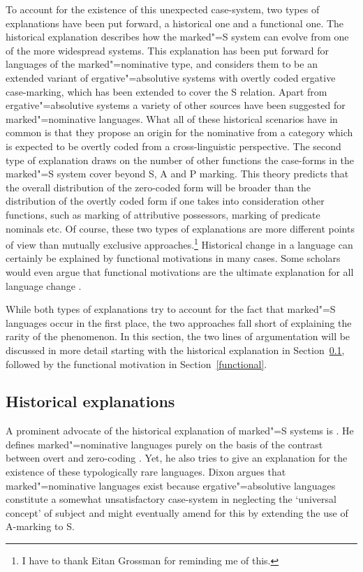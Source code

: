To account for the existence of this unexpected case-system, two types of explanations have been put forward, a historical one and a functional one. 
The historical explanation describes how the marked"=S system can evolve from one of the more widespread systems. 
This explanation has been put forward for languages of the marked"=nominative type, and considers them to be an extended variant of ergative"=absolutive systems with overtly coded ergative case-marking, which has been extended to cover the S relation. 
Apart from ergative"=absolutive systems a variety of other sources have been suggested for marked"=nominative languages. 
What all of these historical scenarios have in common is that they propose an origin for the nominative from a category which is expected to be overtly coded from a cross-linguistic perspective.  
The second type of explanation draws on the number of other functions the case-forms in the marked"=S system cover beyond S, A and P marking. 
This theory predicts that the overall distribution of the zero-coded form will be broader than the distribution of the overtly coded form if one takes into consideration other functions, such as marking of attributive possessors, marking of predicate nominals etc.
Of course, these two types of explanations are more different points of view than mutually exclusive approaches.\footnote{I have to thank Eitan Grossman for reminding me of this.} 
Historical change in a language can certainly be explained by functional motivations in many cases.
Some scholars would even argue that functional motivations are the ultimate explanation for all language change \citep{Keller:1994,Dubois:1987,Croft:2000}.

While both types of explanations try to account for the fact that marked"=S languages occur in the first place, the two approaches fall short of explaining the rarity of the phenomenon.
In this section, the two lines of argumentation will be discussed in more detail starting with the historical explanation in Section~\ref{historical}, followed by the functional motivation in Section~\ref{functional}.  


\subsection{Historical explanations}\label{historical}

A prominent advocate of the historical explanation of marked"=S systems is \citet{Dixon:1979,Dixon:1994}.
He defines marked"=nominative languages purely on the basis of the contrast between overt and zero-coding \citep[76ff.]{Dixon:1994}. 
Yet, he also tries to give an explanation for the existence of these typologically rare languages.
Dixon argues that marked"=nominative languages exist because ergative"=absolutive languages constitute a somewhat unsatisfactory case-system in neglecting the `universal concept' of subject and might eventually amend for this by extending the use of A-marking to S.


